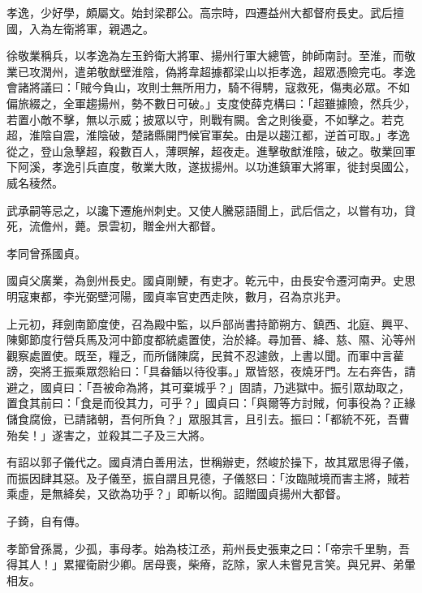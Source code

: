 \begin{pinyinscope}
 孝逸，少好學，頗屬文。始封梁郡公。高宗時，四遷益州大都督府長史。武后擅國，入為左衛將軍，親遇之。



 徐敬業稱兵，以孝逸為左玉鈐衛大將軍、揚州行軍大總管，帥師南討。至淮，而敬業已攻潤州，遣弟敬猷壁淮陰，偽將韋超據都梁山以拒孝逸，超眾憑險完屯。孝逸會諸將議曰：「賊今負山，攻則士無所用力，騎不得騁，寇救死，傷夷必眾。不如偏旅綴之，全軍趨揚州，勢不數日可破。」支度使薛克構曰：「超雖據險，然兵少，若置小敵不擊，無以示威；披眾以守，則戰有闕。舍之則後憂，不如擊之。若克超，淮陰自震，淮陰破，楚諸縣開門候官軍矣。由是以趨江都，逆首可取。」孝逸從之，登山急擊超，殺數百人，薄暝解，超夜走。進擊敬猷淮陰，破之。敬業回軍下阿溪，孝逸引兵直度，敬業大敗，遂拔揚州。以功進鎮軍大將軍，徙封吳國公，威名稜然。



 武承嗣等忌之，以讒下遷施州刺史。又使人騰惡語聞上，武后信之，以嘗有功，貸死，流儋州，薨。景雲初，贈金州大都督。



 孝同曾孫國貞。



 國貞父廣業，為劍州長史。國貞剛鯁，有吏才。乾元中，由長安令遷河南尹。史思明寇東都，李光弼壁河陽，國貞率官吏西走陜，數月，召為京兆尹。



 上元初，拜劍南節度使，召為殿中監，以戶部尚書持節朔方、鎮西、北庭、興平、陳鄭節度行營兵馬及河中節度都統處置使，治於絳。尋加晉、絳、慈、隰、沁等州觀察處置使。既至，糧乏，而所儲陳腐，民貧不忍遽斂，上書以聞。而軍中言雚謗，突將王振乘眾怨紿曰：「具畚鍤以待役事。」眾皆怒，夜燒牙門。左右奔告，請避之，國貞曰：「吾被命為將，其可棄城乎？」固請，乃逃獄中。振引眾劫取之，置食其前曰：「食是而役其力，可乎？」國貞曰：「與爾等方討賊，何事役為？正緣儲食腐儉，已請諸朝，吾何所負？」眾服其言，且引去。振曰：「都統不死，吾曹殆矣！」遂害之，並殺其二子及三大將。



 有詔以郭子儀代之。國貞清白善用法，世稱辦吏，然峻於操下，故其眾思得子儀，而振因肆其惡。及子儀至，振自謂且見德，子儀怒曰：「汝臨賊境而害主將，賊若乘虛，是無絳矣，又欲為功乎？」即斬以徇。詔贈國貞揚州大都督。



 子錡，自有傳。



 孝節曾孫暠，少孤，事母孝。始為枝江丞，荊州長史張柬之曰：「帝宗千里駒，吾得其人！」累擢衛尉少卿。居母喪，柴瘠，訖除，家人未嘗見言笑。與兄昇、弟暈相友。




\end{pinyinscope}
